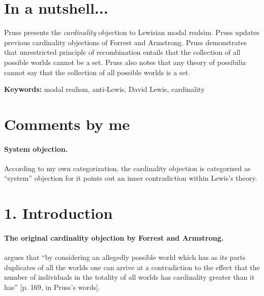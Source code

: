 \documentclass[
10pt, %
a4paper, %
twocolumn, %
landscape %
]{article}
\begin{document}
\pagestyle{myheadings} %
\markright{\doctitle} %


\thispagestyle{plain} %

\printtitle %


\section*{In a nutshell... }
Pruss presents the \emph{cardinality} objection to Lewisian modal realsim.
Pruss updates previous cardinality objections of Forrest and Armstrong. Pruss demonstrates that unrestricted principle of recombination entails that the collection of all possible worlds cannot be a set.
Pruss also notes that any theory of possibilia cannot say that the collection of all possible worlds is a set.

\noindent \textbf{Keywords:} modal realism, anti-Lewis, David Lewis, cardinality

\section*{Comments by me}
\paragraph{System objection.}
According to my own categorization, the cardinality objection is categorized as ``system'' objection for it points out an inner contradiction within Lewis's theory.


\section*{1. Introduction}
\paragraph{The original cardinality objection by Forrest and Armstrong.}
\cite{Forrest1984} argues that ``by considering an allegedly possible world which has as its parts duplicates of all the worlds one can arrive at a contradiction to the effect that the number of individuals in the totality of all worlds has cardinality greater than it has'' [p. 169, in Pruss's words].
\end{document}
